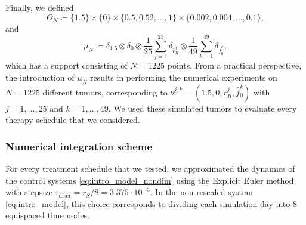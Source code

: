 \documentclass[a4paper,12pt, reqno]{amsart}
\theoremstyle{plain}
\theoremstyle{definition}
\theoremstyle{remark}
\numberwithin{equation}{section}
\begin{document}
Finally, we defined
\begin{equation} \label{eq:Theta_N_simul}
    \Theta_N \coloneqq \{1.5\} \times \{0\} \times \{0.5,0.52,\ldots,1\} \times \{0.002,0.004, \ldots, 0.1\},
\end{equation}
and
\begin{equation} \label{eq:mu_N_simul}
    \mu_N\coloneqq \delta_{1.5}  \otimes \delta_0 \otimes\frac{1}{25}\sum_{j=1}^{25} \delta_{\hat r_R^j} \otimes \frac{1}{49}\sum_{k=1}^{49} \delta_{\hat f_0^k},
\end{equation}
which has a support consisting of $N=1225$ points. From a practical perspective, the introduction of $\mu_N$ results in performing the numerical experiments on $N=1225$ different tumors, corresponding to $\theta^{j,k}=(1.5,0,\hat r_R^j, \hat f_0^k)$ with $j=1,\ldots,25$ and $k=1,\ldots,49$. We used these simulated tumors to evaluate every therapy schedule that we considered.

\subsubsection*{Numerical integration scheme}
For every treatment schedule that we tested, we approximated the dynamics of the control systems \eqref{eq:intro_model_nondim} using the Explicit Euler method with stepsize $\tau_{\mathrm{discr}}=r_S/8=3.375\cdot 10^{-3}$.
In the non-rescaled system \eqref{eq:intro_model}, this choice corresponds to dividing each simulation day into $8$ equi\-spaced time nodes.
\end{document}
